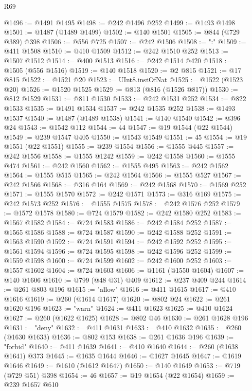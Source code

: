 \begin{lexlean}{R69}
\begin{coremodule}
@1496 := @1491 @1495
@1498 := @242 @1496 @252
@1499 := @1493 @1498
@1501 := @1487 (@1489 @1499)
@1502 := @140 @1501
@1505 := @844 (@729 @389) @398
@1506 := @556 @725
@1507 := @242 @1506
@1508 := ":"
@1509 := @411 @1508
@1510 := @410 @1509
@1512 := @242 @1510 @252
@1513 := @1507 @1512
@1514 := @400 @1513
@1516 := @242 @1514 @420
@1518 := @1505 (@556 @1516)
@1519 := @140 @1518
@1520 := @2 @815
@1521 := @17 @815
@1522 := @1521 @20
@1523 := UInt8.instOfNat
@1525 := @1522 (@1523 @20)
@1526 := @1520 @1525
@1529 := @813 (@816 (@1526 @817))
@1530 := @812 @1529
@1531 := @811 @1530
@1533 := @242 @1531 @252
@1534 := @822 @1533
@1535 := @1491 @1534
@1537 := @242 @1535 @252
@1538 := @1493 @1537
@1540 := @1487 (@1489 @1538)
@1541 := @140 @1540
@1542 := @396 @24
@1543 := @1542 @112
@1544 := 44
@1547 := @19 @1544 (@22 @1544)
@1549 := @239 @1547 @405
@1550 := @1543 @1549
@1551 := 45
@1554 := @19 @1551 (@22 @1551)
@1555 := @239 @1554
@1556 := @1555 @445
@1557 := @242 @1556
@1558 := @1555 @1242
@1559 := @242 @1558
@1560 := @1555 @474
@1561 := @242 @1560
@1562 := @1555 @495
@1563 := @242 @1562
@1564 := @1555 @515
@1565 := @242 @1564
@1566 := @1555 @527
@1567 := @242 @1566
@1568 := @316 @164
@1569 := @242 @1568
@1570 := @1569 @252
@1571 := @1555 @1570
@1572 := @242 @1571
@1573 := @316 @169
@1575 := @242 @1573 @252
@1576 := @1555 @1575
@1578 := @242 @1576 @252
@1579 := @1572 @1578
@1580 := @724 @1579
@1582 := @242 @1580 @252
@1583 := @1567 @1582
@1584 := @724 @1583
@1586 := @242 @1584 @252
@1587 := @1565 @1586
@1588 := @724 @1587
@1590 := @242 @1588 @252
@1591 := @1563 @1590
@1592 := @724 @1591
@1594 := @242 @1592 @252
@1595 := @1561 @1594
@1596 := @724 @1595
@1598 := @242 @1596 @252
@1599 := @1559 @1598
@1600 := @724 @1599
@1602 := @242 @1600 @252
@1603 := @1557 @1602
@1604 := @724 @1603
@1606 := @1161 (@1550 @1604)
@1607 := @140 @1606
@1610 := @799 (@48 @31) @409
@1612 := @237 @409 @244
@1614 := @261 @803 @196
@1615 := "allow"
@1616 := @411 @1615
@1617 := @410 @1616
@1619 := @260 (@1614 @1617)
@1620 := @802 @24
@1622 := @261 @1620 @196
@1623 := "warn"
@1624 := @411 @1623
@1625 := @410 @1624
@1627 := @260 (@1622 @1625)
@1628 := @802 @46
@1630 := @261 @1628 @196
@1631 := "deny"
@1632 := @411 @1631
@1633 := @410 @1632
@1635 := @260 (@1630 @1633)
@1636 := @802 @153
@1638 := @261 @1636 @196
@1639 := "forbid"
@1640 := @411 @1639
@1641 := @410 @1640
@1644 := @260 (@1638 @1641) @373
@1645 := @1635 @1644
@1646 := @1627 @1645
@1647 := @1619 @1646
@1649 := @1610 (@1612 @1647)
@1650 := @140 @1649
@1653 := @719 (@729 @51) @398
@1654 := 46
@1657 := @19 @1654 (@22 @1654)
@1659 := @239 @1657 @610

\end{coremodule}
\end{lexlean}
